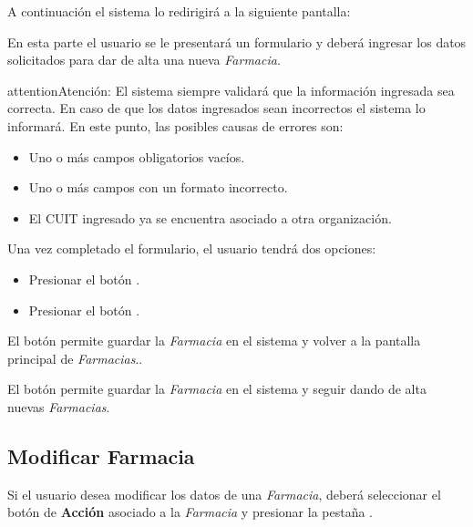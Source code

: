 \documentclass[a4paper,10pt,spanish]{sphinxmanual}
\begin{document}

A continuación el sistema lo redirigirá a la siguiente pantalla:


En esta parte el usuario se le presentará un formulario y deberá ingresar los datos solicitados para dar de alta una nueva \emph{Farmacia}.

\begin{notice}{attention}{Atención:}
El sistema siempre validará que la información ingresada sea correcta. En caso de que los datos ingresados sean incorrectos el sistema lo informará.
En este punto, las posibles causas de errores son:
\begin{itemize}
\item {} 
Uno o más campos obligatorios vacíos.

\item {} 
Uno o más campos con un formato incorrecto.

\item {} 
El CUIT ingresado ya se encuentra asociado a otra organización.

\end{itemize}
\end{notice}

Una vez completado el formulario, el usuario tendrá dos opciones:
\begin{itemize}
\item {} 
Presionar el botón .

\item {} 
Presionar el botón .

\end{itemize}

El botón  permite guardar la \emph{Farmacia} en el sistema y volver a la pantalla
principal de \emph{Farmacias}..

El botón  permite guardar la \emph{Farmacia} en el sistema y seguir dando de alta nuevas \emph{Farmacias}.


\subsection{Modificar Farmacia}
\label{farmacias:modificar-farmacia}\label{farmacias:id2}
Si el usuario desea modificar los datos de una \emph{Farmacia}, deberá seleccionar el botón de \textbf{Acción} asociado a la \emph{Farmacia} y presionar la pestaña .
\end{document}
